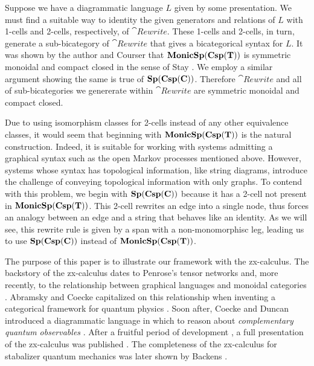 \documentclass[./1--Catfying_zxCalc--Master.tex]{subfiles} %
\begin{document}
Suppose we have a 
diagrammatic language $L$
given by some presentation.  
We must find
a suitable way to identity  
the given generators and relations of $L$
with 1-cells and 2-cells, 
respectively, of $\cat{Rewrite}$.
These 1-cells and 2-cells, in turn, 
generate a sub-bicategory of $\cat{Rewrite}$ 
that gives a bicategorical syntax 
for $L$.  
It was shown by the author and Courser
	\cite{CicalaCourser_BicatSpansCospan} 
that $\mathbf{MonicSp(Csp(T))}$ is 
symmetric monoidal and compact closed
in the sense of Stay 
	\cite{Stay_CompactClosedBicats}.
We employ a similar argument
showing the same is true of $\mathbf{Sp(Csp(C))}$.
Therefore $\cat{Rewrite}$ and 
all of sub-bicategories
we genererate within $\cat{Rewrite}$ 
are symmetric monoidal and compact closed.

Due to using isomorphism classes for 2-cells
instead of any other equivalence classes,
it would seem that beginning with 
$\mathbf{MonicSp(Csp(T))}$ is the natural construction. 
Indeed, it is suitable for working with systems 
admitting a graphical syntax such as
the open Markov processes mentioned above. 
However, systems whose 
syntax has topological information, 
like string diagrams, 
introduce the challenge of 
conveying topological information 
with only graphs. 
To contend with this problem, 
we begin with $\mathbf{Sp(Csp(C))}$ 
because it has a 2-cell 
not present in $\mathbf{MonicSp(Csp(T))}$.
This 2-cell rewrites an edge into a single node,
thus forces an analogy between an edge
and a string that behaves like an identity.
As we will see, this rewrite rule is given by 
a span with a non-monomorphisc leg, 
leading us to use
$\mathbf{Sp(Csp(C))}$ instead of $\mathbf{MonicSp(Csp(T))}$. 

The purpose of this paper is 
to illustrate our framework with
the zx-calculus.  
The backstory of the zx-calculus dates to 
Penrose's tensor networks
	\cite{Penrose_NegDimTensors} 
and, more recently, 
to the relationship between 
graphical languages and 
monoidal categories 
	\cite{JoyalStreet_GeomTensorCalc,Selinger_GraphicsMonCats}.  
Abramsky and Coecke 
capitalized on this relationship 
when inventing a categorical framework 
for quantum physics
	\cite{AbramCoecke_CatSemanticQuantum}.  
Soon after, 
Coecke and Duncan 
introduced a diagrammatic language 
in which to reason about 
\emph{complementary quantum observables} 
	\cite{CoeckeDuncan_QuantumObsInitialReport}. 
After a fruitful period of development
	\cite{CoeckeEdwardsSpekkens_PhaseGrpsNonLocality,
		CoeckePerdix_EnvironClassicChannels,
		DuncanPerdix_GraphStatesEulerDecomp,
		DuncanPerdrix_RewritingQuantumCompu,
		EvansDuncanLangPanan_ClassMutualUnbias,
		Pavlovic_QuanClassNondetermCompu}, 
a full presentation of 
the zx-calculus was published
	\cite{CoeckeDuncan_QuantumObsFullPaper}.
The completeness of 
the zx-calculus for 
stabalizer quantum mechanics 
was later shown by Backens 
	\cite{Backens_Completeness}.  
\end{document}
